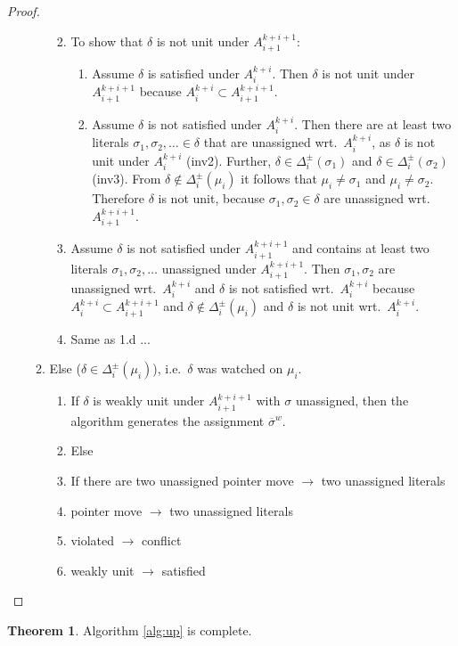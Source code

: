 \documentclass{vutinfth} %
\theoremstyle{example}
\theoremstyle{definition}
\theoremstyle{theorem}
\newtheorem{theorem}{Theorem}[section]
\theoremstyle{lemma}
\theoremstyle{corollary}
\newcommand{\negweak}[1]{\overline{#1}^w}
\newcommand{\ass}{A}
\newcommand{\fabef}{\ass_{i}}
\newcommand{\faaf}{\ass_{i + 1}}
\newcommand{\abef}{\fabef^{k + i}}
\newcommand{\aaf}{\faaf^{k + i + 1}}
\newcommand{\dbef}{\Delta_{i}}
\newcommand{\sgl}{\mu}
\newcommand{\bsgl}{\sigma}
\begin{document}
\begin{proof}
\begin{enumerate}
\begin{enumerate}
\begin{enumerate}
\begin{enumerate}
\end{enumerate}
\item To show that $\delta$ is not unit under $\aaf$:
\begin{enumerate}
\item Assume $\delta$ is satisfied under $\abef$. Then $\delta$ is not unit under $\aaf$ because $\abef \subset \aaf$.
\item Assume $\delta$ is not satisfied under $\abef$. Then there are at least two literals $\bsgl_1, \bsgl_2, \ldots \in \delta$ that are unassigned wrt.~$\abef$, as $\delta$ is not unit under $\abef$ (inv2). Further, $\delta \in \dbef^\pm(\bsgl_1)$ and $\delta \in \dbef^\pm(\bsgl_2)$ (inv3). From $\delta \not \in \dbef^\pm(\sgl_i)$ it follows that $\sgl_i \not = \bsgl_1$ and $\sgl_i \not = \bsgl_2$. %
Therefore $\delta$ is not unit, because $\bsgl_1, \bsgl_2 \in \delta$ are unassigned wrt.~$\aaf$.
\end{enumerate}
\item Assume $\delta$ is not satisfied under $\aaf$ and contains at least two literals $\bsgl_1, \bsgl_2, \ldots$ unassigned under $\aaf$. Then $\bsgl_1, \bsgl_2$ are unassigned wrt.~$\abef$ and $\delta$ is not satisfied wrt.~$\abef$ because $\abef \subset \aaf$ and $\delta \not \in \dbef^\pm(\sgl_i)$ and $\delta$ is not unit wrt.~$\abef$.
\item Same as 1.d ...
\end{enumerate}
\item Else ($\delta \in \dbef^\pm(\sgl_i)$), i.e.~$\delta$ was watched on $\sgl_i$.
\begin{enumerate}
\item If $\delta$ is weakly unit under $\aaf$ with $\bsgl$ unassigned, then the algorithm generates the assignment $\negweak{\bsgl}$.
\item Else
\item If there are two unassigned pointer move $\to$ two unassigned literals
\item pointer move $\to$ two unassigned literals
\item violated $\to$ conflict
\item weakly unit $\to$ satisfied
\end{enumerate}
\end{enumerate}
\end{enumerate}
\end{proof}

\begin{theorem}
Algorithm \ref{alg:up} is complete.
\end{theorem}
\end{document}

